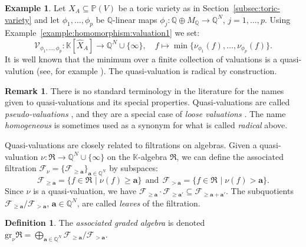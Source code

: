 \documentclass[12pt, a4article]{amsart}   	%
\numberwithin{equation}{section}
\theoremstyle{plain}
\theoremstyle{definition}
\newtheorem{remark}[theorem]{Remark}
\newtheorem{example}[theorem]{Example}
\newtheorem{definition}[theorem]{Definition}
\begin{document}
\begin{example}\label{example:quasi:valuation1}
Let $X_A\subseteq \mathbb P(V)$ be a toric variety as in Section~\ref{subsec:toric-variety} and let $\phi_1,\ldots,\phi_p$ be $\mathbb{Q}$-linear maps $\phi_j:\mathbb Q\oplus M_\mathbb Q\rightarrow \mathbb Q^N$,  $j=1,\ldots,p$. Using Example~\ref{example:homomorphism:valuation1} we set:
$$\mathcal V_{\phi_1,\ldots,\phi_p}:\mathbb K[\hat X_{A}]\rightarrow \mathbb Q^N\cup\{\infty\},\quad f\mapsto \min\{\nu_{\phi_1}(f),\ldots,\nu_{\phi_p}(f)\}.$$
It is well known that the minimum over a finite collection of valuations is a quasi-valution (see, for example \cite[Proposition 4.1]{FL}). The quasi-valuation is radical by construction.
\end{example}

\begin{remark}\rm
There is no standard terminology in the literature for the names given to quasi-valuations and its special properties. Quasi-valuations are called \emph{pseudo-valuations} \cite{B}, and they are a special case of \emph{loose valuations} \cite{T}. The name \emph{homogeneous} is sometimes used as a synonym for what is called \emph{radical} above.
\end{remark}

Quasi-valuations are closely related to filtrations on algebras. Given a quasi-valuation $\nu:\mathfrak R\rightarrow \mathbb Q^N\cup\{\infty\}$ on the $\mathbb K$-algebra $\mathfrak R$, we can define the associated filtration $\mathcal F_\nu=\{\mathcal F_{\ge \mathbf{a}}\}_{\mathbf{a}\in\mathbb Q^N}$ by subspaces:
$$\mathcal F_{\ge \mathbf a}= \{f\in \mathfrak R_{}\mid \nu(f)\ge \mathbf{a}\}\ \ \text{and}\ \ 
\mathcal F_{> \mathbf a}= \{f\in \mathfrak R_{}\mid \nu(f)> \mathbf{a}\}.$$
Since $\nu$ is a quasi-valuation, we have $\mathcal F_{\ge \mathbf a}\cdot \mathcal F_{\ge \mathbf a'}\subseteq \mathcal F_{\ge \mathbf a+\mathbf a'}$. The subquotients $\mathcal F_{\ge \mathbf a}/\mathcal F_{> \mathbf a}$, $\mathbf{a}\in\mathbb Q^N$, are called \emph{leaves} of the filtration. 

\begin{definition}\label{definition:associated:graded:algebra}\rm
The \emph{associated graded algebra} is denoted $\mathrm{gr}_\nu\mathfrak R
=\bigoplus_{\mathbf a\in\mathbb{Q}^N}\mathcal F_{\ge\mathbf a}/\mathcal F_{>\mathbf a}$.
\end{definition}





\end{document}
